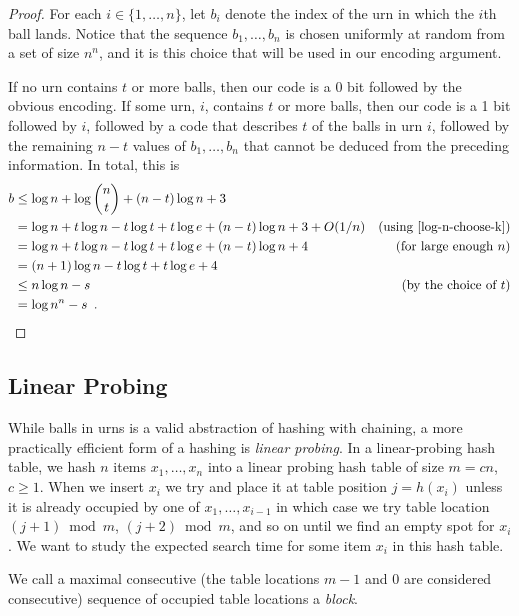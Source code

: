 \documentclass[lotsofwhite]{patmorin}
\begin{document}
\begin{proof}
  For each $i\in\{1,\ldots,n\}$, let $b_i$ denote the index of the urn in
  which the $i$th ball lands. Notice that the sequence $b_1,\ldots,b_n$
  is chosen uniformly at random from a set of size $n^n$, and it is this
  choice that will be used in our encoding argument.

  If no urn contains $t$ or more balls, then our code is a 0 bit followed
  by the obvious encoding. If some urn, $i$, contains $t$ or more balls,
  then our code is a 1 bit followed by $i$, followed by a code that
  describes $t$ of the balls in urn $i$, followed by the remaining $n-t$
  values of $b_1,\ldots,b_n$ that cannot be deduced from the preceding
  information.  In total, this is
  \begin{align*}
    b &\le \log n + \log\binom{n}{t} 
           + (n-t)\log n + 3 \\
     & = \log n + t\log n - t\log t + t\log e  
           + (n-t)\log n + 3 + O(1/n)
             & \text{(using \eqref{log-n-choose-k})} \\
     & = \log n + t\log n - t\log t + t\log e  
           + (n-t)\log n + 4
             & \text{(for large enough $n$)} \\
     & = (n+1)\log n - t\log t + t\log e + 4 \\
     & \le  n\log n - s &\text{(by the choice of $t$)} \\
     & =  \log n^n - s \enspace . & \qedhere
  \end{align*}
\end{proof}

\subsection{Linear Probing}

While balls in urns is a valid abstraction of hashing with chaining, a more practically efficient form of a hashing is \emph{linear probing}.  
In a linear-probing hash table, we hash $n$ items $x_1,\ldots,x_n$ into
a linear probing hash table of size $m=cn$, $c\ge 1$. When we insert
$x_i$ we try and place it at table position $j=h(x_i)$ unless it is
already occupied by one of $x_1,\ldots,x_{i-1}$ in which case we try
table location $(j+1)\bmod m$, $(j+2)\bmod m$, and so on until we find
an empty spot for $x_i$.  We want to study the expected search time for
some item $x_i$ in this hash table.

We call a maximal consecutive (the table locations $m-1$ and
$0$ are considered consecutive) sequence of occupied table locations
a \emph{block}.
\end{document}
